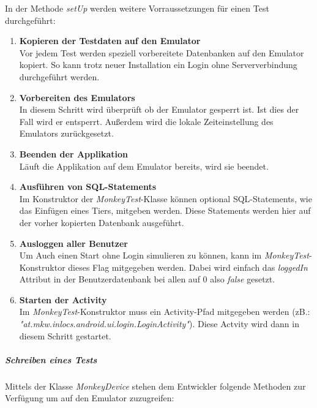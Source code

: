 In der Methode \textit{setUp} werden weitere Vorraussetzungen für einen Test durchgeführt:
\begin{enumerate}
\item{\textbf{Kopieren der Testdaten auf den Emulator}} \\
Vor jedem Test werden speziell vorbereitete Datenbanken auf den Emulator kopiert. So kann trotz neuer Installation ein Login ohne Serververbindung durchgeführt werden.
\item{\textbf{Vorbereiten des Emulators}} \\
In diesem Schritt wird überprüft ob der Emulator gesperrt ist. Ist dies der Fall wird er entsperrt. Außerdem wird die lokale Zeiteinstellung des Emulators zurückgesetzt.
\item{\textbf{Beenden der Applikation}} \\
Läuft die Applikation auf dem Emulator bereits, wird sie beendet.
\item{\textbf{Ausführen von SQL-Statements}} \\
Im Konstruktor der \textit{MonkeyTest}-Klasse können optional SQL-Statements, wie das Einfügen eines Tiers, mitgeben werden. Diese Statements werden hier auf der vorher kopierten Datenbank ausgeführt.
\item{\textbf{Ausloggen aller Benutzer}} \\
Um Auch einen Start ohne Login simulieren zu können, kann im \textit{MonkeyTest}-Konstruktor dieses Flag mitgegeben werden. Dabei wird einfach das \textit{loggedIn} Attribut in der Benutzerdatenbank bei allen auf 0 also \textit{false} gesetzt.
\item{\textbf{Starten der Activity}} \\
Im \textit{MonkeyTest}-Konstruktor muss ein Activity-Pfad mitgegeben werden (zB.:\\\textit{"at.mkw.inlocs.android.ui.login.LoginActivity"}). Diese Actvity wird dann in diesem Schritt gestartet.
\end{enumerate}
\subparagraph{Schreiben eines Tests}
Mittels der Klasse \textit{MonkeyDevice} stehen dem Entwickler folgende Methoden zur Verfügung um auf den Emulator zuzugreifen:

